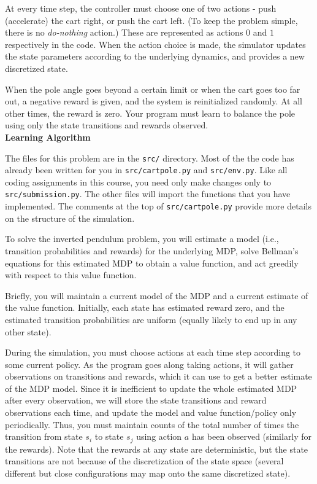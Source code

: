 At every time step, the controller must choose one of two actions -
push (accelerate) the cart right, or push the cart left.
(To keep the problem simple, there is no {\it do-nothing} action.)
These are represented as actions $0$ and $1$ respectively in the code.  
When the action choice is made, the simulator updates the state parameters 
according to the underlying dynamics, and provides a new discretized state.

When the pole angle goes beyond a certain limit or when the cart goes
too far out, a negative reward is given, and the system is reinitialized 
randomly. At all other times, the reward is zero.  Your program must learn 
to balance the pole using only the state transitions and rewards observed.\\

\textbf{Learning Algorithm}

The files for this problem are in the {\tt src/} directory.
Most of the the code has already been written for you in {\tt src/cartpole.py}
and {\tt src/env.py}.  Like all coding assignments in this course, you need only
make changes only to {\tt src/submission.py}. The other files will import the
functions that you have implemented.  The comments at the top of
{\tt src/cartpole.py} provide more details on the structure of the simulation.

To solve the inverted pendulum problem, you will estimate a 
model (i.e., transition probabilities and rewards) for the underlying 
MDP, solve Bellman's equations for this estimated MDP to obtain
a value function, and act greedily with respect to this value function.  

Briefly, you will maintain a current model of the MDP and a current
estimate of the value function. Initially, each state has estimated reward zero,
and the estimated transition probabilities are uniform (equally likely 
to end up in any other state).

During the simulation, you must choose actions at each time step 
according to some current policy.  As the program goes along taking 
actions, it will gather observations on transitions and rewards,
which it can use to get a better estimate of the MDP model.
Since it is inefficient to update the whole estimated MDP after every 
observation, we will store the state transitions and reward observations 
each time, and update the model and value function/policy only periodically. 
Thus, you must maintain counts of the total number of times the 
transition from state $s_i$ to state $s_j$ using action $a$ has been 
observed (similarly for the rewards).  Note that the rewards at 
any state are deterministic, but the state transitions are not because 
of the discretization of the state space (several different but close
configurations may map onto the same discretized state).

